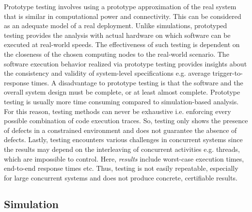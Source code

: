 Prototype testing involves using a prototype approximation of the real system that is similar in computational power and connectivity. This can be considered as an adequate model of a real deployment. Unlike simulations, prototyped testing provides the analysis with actual hardware on which software can be executed at real-world speeds. The effectiveness of such testing is dependent on the closeness of the chosen computing nodes to the real-world scenario. The software execution behavior realized via prototype testing provides insights about the consistency and validity of system-level specifications e.g. average trigger-to-response times. A disadvantage to prototype testing is that the software and the overall system design must be complete, or at least almost complete. Prototype testing is usually more time consuming compared to simulation-based analysis. For this reason, testing methods can never be exhaustive i.e. enforcing every possible combination of code execution traces. So, testing only shows the presence of defects in a constrained environment and does not guarantee the absence of defects. Lastly, testing encounters various challenges in concurrent systems since the results may depend on the interleaving of concurrent activities e.g. threads, which are impossible to control. Here, \emph{results} include worst-case execution times, end-to-end response times etc. Thus, testing is not easily repeatable, especially for large concurrent systems and does not produce concrete, certifiable results. 


\subsection{Simulation}
\label{sec:simulation}

